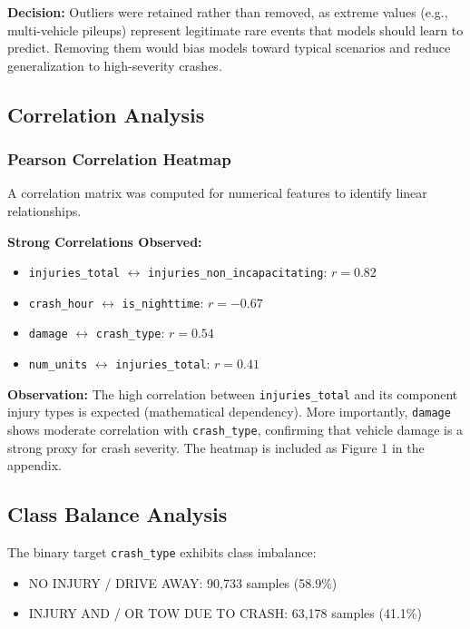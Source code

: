 \documentclass[12pt,man]{apa7}
\begin{document}
\textbf{Decision:} Outliers were retained rather than removed, as extreme values (e.g., multi-vehicle pileups) represent legitimate rare events that models should learn to predict. Removing them would bias models toward typical scenarios and reduce generalization to high-severity crashes.

\subsection{Correlation Analysis}

\subsubsection{Pearson Correlation Heatmap}

A correlation matrix was computed for numerical features to identify linear relationships.

\textbf{Strong Correlations Observed:}
\begin{itemize}
    \item \texttt{injuries\_total} $\leftrightarrow$ \texttt{injuries\_non\_incapacitating}: $r = 0.82$
    \item \texttt{crash\_hour} $\leftrightarrow$ \texttt{is\_nighttime}: $r = -0.67$
    \item \texttt{damage} $\leftrightarrow$ \texttt{crash\_type}: $r = 0.54$
    \item \texttt{num\_units} $\leftrightarrow$ \texttt{injuries\_total}: $r = 0.41$
\end{itemize}

\textbf{Observation:} The high correlation between \texttt{injuries\_total} and its component injury types is expected (mathematical dependency). More importantly, \texttt{damage} shows moderate correlation with \texttt{crash\_type}, confirming that vehicle damage is a strong proxy for crash severity. The heatmap is included as Figure 1 in the appendix.

\subsection{Class Balance Analysis}

The binary target \texttt{crash\_type} exhibits class imbalance:

\begin{itemize}
    \item NO INJURY / DRIVE AWAY: 90,733 samples (58.9\%)
    \item INJURY AND / OR TOW DUE TO CRASH: 63,178 samples (41.1\%)
\end{itemize}
\end{document}
